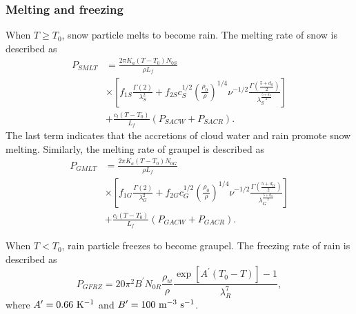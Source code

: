 \subsubsection{Melting and freezing}
When $T \geq T_{0}$, snow particle melts to become rain. The melting rate of snow is described as
\begin{align}
  P_{SMLT}&=\frac{2\pi K_{a}(T-T_{0})N_{0S}}{\rho L_{f}} \nonumber \\
  &\times\left[f_{1S}\frac{\Gamma(2)}{\lambda^{2}_{S}}+f_{2S}c^{1/2}_{S}\left(\frac{\rho_{0}}{\rho}\right)^{1/4}\nu^{-1/2}\frac{\Gamma(\frac{5+d_{S}}{2})}{\lambda^{\frac{5+d_{S}}{2}}_{S}}\right] \nonumber \\
  &+\frac{c_{l}(T-T_{0})}{L_{f}}(P_{SACW}+P_{SACR}).
\end{align}
The last term indicates that the accretions of cloud water and rain promote snow melting. Similarly, the melting rate of graupel is described as
\begin{align}
  P_{GMLT}&=\frac{2\pi K_{a}(T-T_{0})N_{0G}}{\rho L_{f}} \nonumber \\
  &\times\left[f_{1G}\frac{\Gamma(2)}{\lambda^{2}_{G}}+f_{2G}c^{1/2}_{G}\left(\frac{\rho_{0}}{\rho}\right)^{1/4}\nu^{-1/2}\frac{\Gamma(\frac{5+d_{G}}{2})}{\lambda^{\frac{5+d_{G}}{2}}_{G}}\right] \nonumber \\
  &+\frac{c_{l}(T-T_{0})}{L_{f}}(P_{GACW}+P_{GACR}).
\end{align}

When $T < T_{0}$, rain particle freezes to become graupel. The freezing rate of rain is described as
\begin{equation}
  P_{GFRZ}=20\pi^{2}B^{\prime}N_{0R}\frac{\rho_{w}}{\rho}\frac{\exp[A^{\prime}(T_{0}-T)]-1}{\lambda^{7}_{R}},
\end{equation}
where $A^{\prime}=0.66 {\rm \ K^{-1}}$ and $B^{\prime}=100 {\rm \ m^{-3} \ s^{-1}}$.

